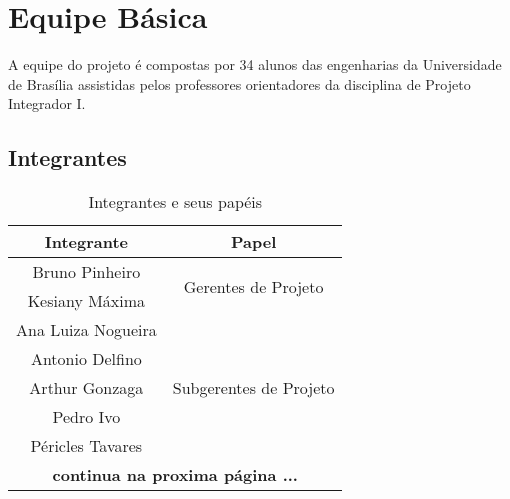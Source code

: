 \section{Equipe Básica}

  A equipe do projeto é compostas por 34 alunos das engenharias
  da Universidade de Brasília assistidas pelos professores orientadores
  da disciplina de Projeto Integrador I.

  \subsection{Integrantes}

  \begin{table}[ht]
    \centering
    \caption{Integrantes e seus papéis}
    \begin{tabular}{| c | c |}
      \hline
      \textbf{Integrante} & \textbf{Papel} \\
      \hline
      Bruno Pinheiro & \multirow{2}{*}{Gerentes de Projeto} \\
      Kesiany Máxima & \\
      \hline
      Ana Luiza Nogueira & \multirow{5}{*}{Subgerentes de Projeto} \\
      Antonio Delfino & \\
      Arthur Gonzaga & \\
      Pedro Ivo & \\
      Péricles Tavares & \\
      \hline
      \multicolumn{2}{|c|}{\textbf{continua na proxima página ...}} \\
      \hline
    \end{tabular}
  \end{table}

